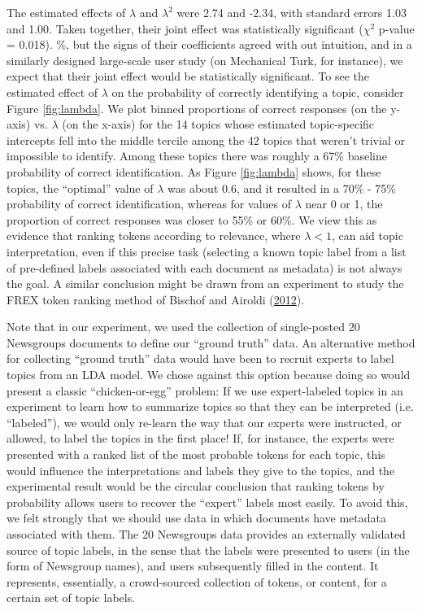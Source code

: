 \documentclass[12pt,]{isuthesis}
\begin{document}
The estimated effects of \(\lambda\) and \(\lambda^2\) were 2.74 and
-2.34, with standard errors 1.03 and 1.00. Taken together, their joint
effect was statistically significant (\(\chi^2\) p-value = 0.018). \%,
but the signs of their coefficients agreed with out intuition, and in a
similarly designed large-scale user study (on Mechanical Turk, for
instance), we expect that their joint effect would be statistically
significant. To see the estimated effect of \(\lambda\) on the
probability of correctly identifying a topic, consider Figure
\ref{fig:lambda}. We plot binned proportions of correct responses (on
the y-axis) vs. \(\lambda\) (on the x-axis) for the 14 topics whose
estimated topic-specific intercepts fell into the middle tercile among
the 42 topics that weren't trivial or impossible to identify. Among
these topics there was roughly a 67\% baseline probability of correct
identification. As Figure \ref{fig:lambda} shows, for these topics, the
``optimal'' value of \(\lambda\) was about 0.6, and it resulted in a
70\% - 75\% probability of correct identification, whereas for values of
\(\lambda\) near 0 or 1, the proportion of correct responses was closer
to 55\% or 60\%. We view this as evidence that ranking tokens according
to relevance, where \(\lambda < 1\), can aid topic interpretation, even
if this precise task (selecting a known topic label from a list of
pre-defined labels associated with each document as metadata) is not
always the goal. A similar conclusion might be drawn from an experiment
to study the FREX token ranking method of Bischof and Airoldi
(\protect\hyperlink{ref-Bischof}{2012}).

Note that in our experiment, we used the collection of single-posted 20
Newsgroups documents to define our ``ground truth'' data. An alternative
method for collecting ``ground truth'' data would have been to recruit
experts to label topics from an LDA model. We chose against this option
because doing so would present a classic ``chicken-or-egg'' problem: If
we use expert-labeled topics in an experiment to learn how to summarize
topics so that they can be interpreted (i.e. ``labeled''), we would only
re-learn the way that our experts were instructed, or allowed, to label
the topics in the first place! If, for instance, the experts were
presented with a ranked list of the most probable tokens for each topic,
this would influence the interpretations and labels they give to the
topics, and the experimental result would be the circular conclusion
that ranking tokens by probability allows users to recover the
``expert'' labels most easily. To avoid this, we felt strongly that we
should use data in which documents have metadata associated with them.
The 20 Newsgroups data provides an externally validated source of topic
labels, in the sense that the labels were presented to users (in the
form of Newsgroup names), and users subsequently filled in the content.
It represents, essentially, a crowd-sourced collection of tokens, or
content, for a certain set of topic labels.
\end{document}
